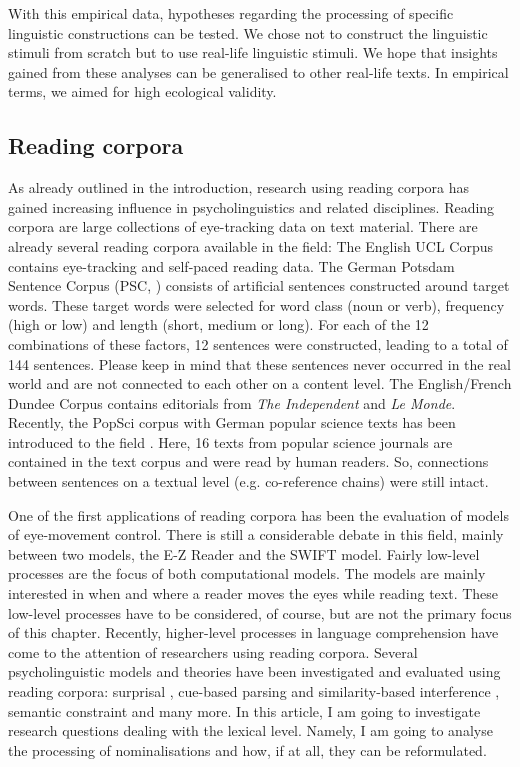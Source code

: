 \documentclass[output=paper]{langsci/langscibook}
\begin{document}
With this empirical data, hypotheses regarding the processing of specific linguistic constructions can be tested. We chose not to construct the linguistic stimuli from scratch but to use real-life linguistic stimuli. We hope that insights gained from these analyses can be generalised to other real-life texts. In empirical terms, we aimed for high ecological validity. 

\subsection{\label{bkm:Ref283725832}Reading corpora}

As already outlined in the introduction, research using reading corpora has gained increasing influence in psycholinguistics and related disciplines. Reading corpora are large collections of eye-tracking data on text material. There are already several reading corpora available in the field: The English UCL Corpus \citep{Frank2013} contains eye-tracking and self-paced reading data. The German Potsdam Sentence Corpus (PSC, \citealt{Kliegl2006}) consists of artificial sentences constructed around target words. These target words were selected for word class (noun or verb), frequency (high or low) and length (short, medium or long). For each of the 12 combinations of these factors, 12 sentences were constructed, leading to a total of 144 sentences. Please keep in mind that these sentences never occurred in the real world and are not connected to each other on a content level. The English/French Dundee Corpus \citep{Kennedy2003} contains editorials from \textit{The Independent }and \textit{Le Monde}. Recently, the PopSci corpus with German popular science texts has been introduced to the field \citep{MuellerFeldmeth2013}. Here, 16 texts from popular science journals are contained in the text corpus and were read by human readers. So, connections between sentences on a textual level (e.g. co-reference chains) were still intact.

One of the first applications of reading corpora has been the evaluation of models of eye-movement control. There is still a considerable debate in this field, mainly between two models, the E-Z Reader \citep{Reichle2003} and the SWIFT \citep{Engbert2005} model. Fairly low-level processes are the focus of both computational models. The models are mainly interested in when and where a reader moves the eyes while reading text. These low-level processes have to be considered, of course, but are not the primary focus of this chapter. Recently, higher-level processes in language comprehension have come to the attention of researchers using reading corpora. Several psycholinguistic models and theories have been investigated and evaluated using reading corpora: surprisal \citep{Demberg2008, Patil2009}, cue-based parsing and similarity-based interference \citep{MuellerFeldmeth2013}, semantic constraint \citep{Pynte2008} and many more. In this article, I am going to investigate research questions dealing with the lexical level. Namely, I am going to analyse the processing of nominalisations and how, if at all, they can be reformulated.
\end{document}

